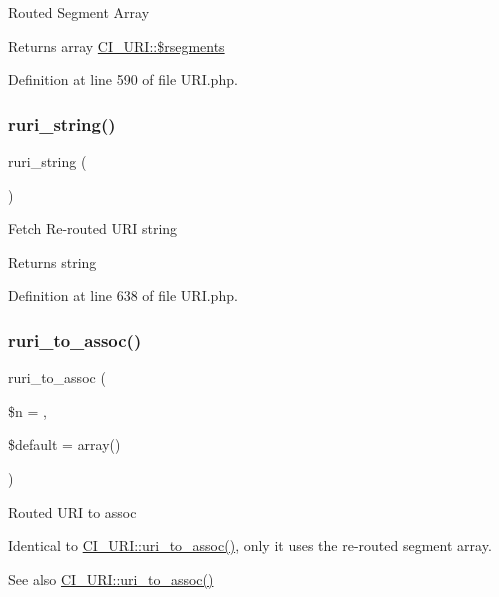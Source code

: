 Routed Segment Array

\begin{DoxyReturn}{Returns}
array \mbox{\hyperlink{class_c_i___u_r_i_abf60189292b5fda02cdf36e5d7417a33}{C\+I\+\_\+\+U\+R\+I\+::\$rsegments}} 
\end{DoxyReturn}


Definition at line 590 of file U\+R\+I.\+php.

\mbox{\label{class_c_i___u_r_i_a53a97a8b68f500980b84e3b060400221}} 
\subsubsection{\texorpdfstring{ruri\_string()}{ruri\_string()}}
{\footnotesize\ttfamily ruri\+\_\+string (\begin{DoxyParamCaption}{ }\end{DoxyParamCaption})}

Fetch Re-\/routed U\+RI string

\begin{DoxyReturn}{Returns}
string 
\end{DoxyReturn}


Definition at line 638 of file U\+R\+I.\+php.

\mbox{\label{class_c_i___u_r_i_a3f375a2026349f1fce7915966eba6d5b}} 
\subsubsection{\texorpdfstring{ruri\_to\_assoc()}{ruri\_to\_assoc()}}
{\footnotesize\ttfamily ruri\+\_\+to\+\_\+assoc (\begin{DoxyParamCaption}\item[{}]{\$n = {},  }\item[{}]{\$default = {\ttfamily array()} }\end{DoxyParamCaption})}

Routed U\+RI to assoc

Identical to \mbox{\hyperlink{class_c_i___u_r_i_a67cca74de71898ee88c167a265cff140}{C\+I\+\_\+\+U\+R\+I\+::uri\+\_\+to\+\_\+assoc()}}, only it uses the re-\/routed segment array.

\begin{DoxySeeAlso}{See also}
\mbox{\hyperlink{class_c_i___u_r_i_a67cca74de71898ee88c167a265cff140}{C\+I\+\_\+\+U\+R\+I\+::uri\+\_\+to\+\_\+assoc()}} 
\end{DoxySeeAlso}

